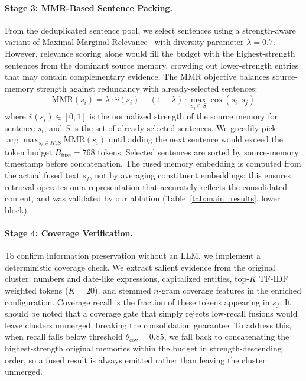 \paragraph{Stage 3: MMR-Based Sentence Packing.}
From the deduplicated sentence pool, we select sentences using a strength-aware variant of Maximal Marginal Relevance~\citep{Carbonell1998MMR} with diversity parameter $\lambda = 0.7$. However, relevance scoring alone would fill the budget with the highest-strength sentences from the dominant source memory, crowding out lower-strength entries that may contain complementary evidence. The MMR objective balances source-memory strength against redundancy with already-selected sentences:
\begin{equation}
\text{MMR}(s_i) = \lambda \cdot \hat{v}(s_i) - (1-\lambda) \cdot \max_{s_j \in S} \cos(s_i, s_j)
\end{equation}
where $\hat{v}(s_i) \in [0,1]$ is the normalized strength of the source memory for sentence $s_i$, and $S$ is the set of already-selected sentences. We greedily pick $\arg\max_{s_i \in R \setminus S} \text{MMR}(s_i)$ until adding the next sentence would exceed the token budget $B_{\text{fuse}} = 768$ tokens. Selected sentences are sorted by source-memory timestamp before concatenation. The fused memory embedding is computed from the actual fused text $s_f$, not by averaging constituent embeddings; this ensures retrieval operates on a representation that accurately reflects the consolidated content, and was validated by our ablation (Table~\ref{tab:main_results}, lower block).

\paragraph{Stage 4: Coverage Verification.}
To confirm information preservation without an LLM, we implement a deterministic coverage check. We extract salient evidence from the original cluster: numbers and date-like expressions, capitalized entities, top-$K$ TF-IDF weighted tokens ($K=20$), and stemmed $n$-gram coverage features in the enriched configuration. Coverage recall is the fraction of these tokens appearing in $s_f$. It should be noted that a coverage gate that simply rejects low-recall fusions would leave clusters unmerged, breaking the consolidation guarantee. To address this, when recall falls below threshold $\theta_{\text{cov}} = 0.85$, we fall back to concatenating the highest-strength original memories within the budget in strength-descending order, so a fused result is always emitted rather than leaving the cluster unmerged.

